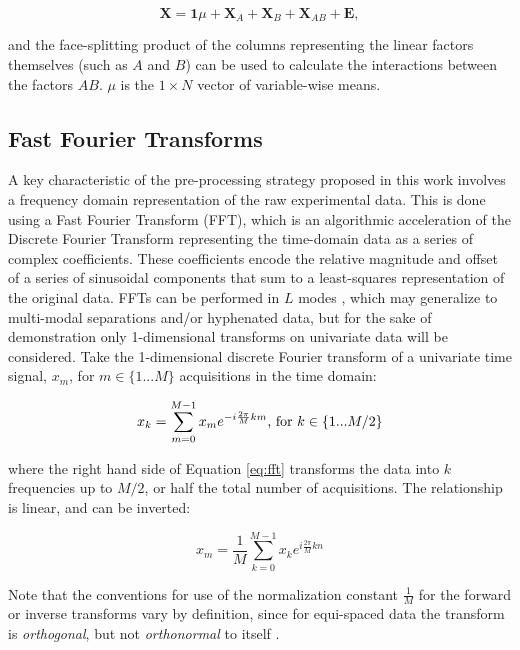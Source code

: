 \documentclass[preprint,12pt]{elsarticle}
\begin{document}
\begin{equation}
    \mathbf{X} = \mathbf{1}\mu + \mathbf{X}_A + \mathbf{X}_B + \mathbf{X}_{AB} + \mathbf{E},
\end{equation}

\noindent and the face-splitting product of the columns representing the linear factors themselves (such as $A$ and $B$) can be used to calculate the interactions between the factors $AB$. $\mu$ is the $1\times N$ vector of variable-wise means.

\subsection{Fast Fourier Transforms}

A key characteristic of the pre-processing strategy proposed in this work involves a frequency domain representation of the raw experimental data. This is done using a Fast Fourier Transform (FFT), which is an algorithmic acceleration of the Discrete Fourier Transform representing the time-domain data as a series of complex coefficients. These coefficients encode the relative magnitude and offset of a series of sinusoidal components that sum to a least-squares representation of the original data. FFTs can be performed in $L$ modes \cite{smith1995handbook}, which may generalize to multi-modal separations and/or hyphenated data, but for the sake of demonstration only 1-dimensional transforms on univariate data will be considered. Take the 1-dimensional discrete Fourier transform of a univariate time signal, $x_m$, for $m \in \{1...M\}$ acquisitions in the time domain:

\begin{equation}\label{eq:fft}
    x_k = \sum_{m=0}^{M-1} x_m e^{-i \frac{2\pi}{M} km}\textnormal{, for } k \in \{1...M/2\}
\end{equation}

\noindent where the right hand side of Equation \ref{eq:fft} transforms the data into $k$ frequencies up to $M/2$, or half the total number of acquisitions. The relationship is linear, and can be inverted:

\begin{equation}\label{eq:ifft}
    x_m = \frac{1}{M} \sum_{k=0}^{M-1} x_k e^{i \frac{2\pi}{M} kn}
\end{equation}

Note that the conventions for use of the normalization constant $\frac{1}{M}$ for the forward or inverse transforms vary by definition, since for equi-spaced data the transform is \textit{orthogonal}, but not \textit{orthonormal} to itself \cite{armstrong2023direct}.
\end{document}
